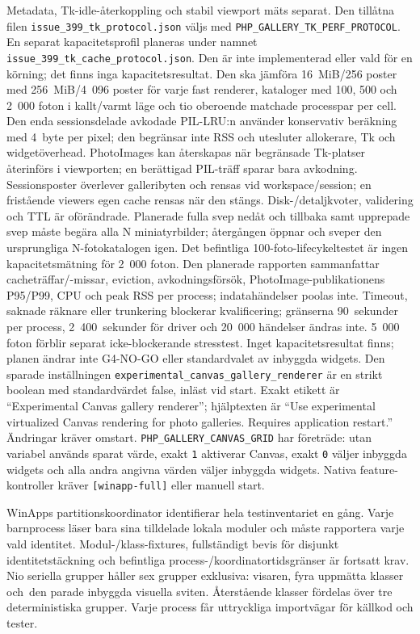 \documentclass[11pt,a4paper]{article}
\newcommand{\codeword}[1]{\nolinkurl{#1}}
\begin{document}
Metadata, Tk-idle-återkoppling och stabil
viewport mäts separat. Den tillåtna filen
\codeword{issue_399_tk_protocol.json} väljs med
\codeword{PHP_GALLERY_TK_PERF_PROTOCOL}. En separat kapacitetsprofil planeras under namnet
\codeword{issue_399_tk_cache_protocol.json}. Den är inte implementerad eller
vald för en körning; det finns inga kapacitetsresultat. Den ska jämföra
16~MiB/256 poster med 256~MiB/4~096 poster för varje fast renderer, kataloger
med 100, 500 och 2~000 foton i kallt/varmt läge och tio oberoende matchade
processpar per cell. Den enda sessionsdelade avkodade PIL-LRU:n använder
konservativ beräkning med 4~byte per pixel; den begränsar inte RSS och utesluter
allokerare, Tk och widgetöverhead. PhotoImages kan återskapas när begränsade
Tk-platser återinförs i viewporten; en berättigad PIL-träff sparar bara
avkodning. Sessionsposter överlever galleribyten och rensas vid workspace/session;
en fristående viewers egen cache rensas när den stängs. Disk-/detaljkvoter,
validering och TTL är oförändrade. Planerade fulla svep nedåt och tillbaka samt
upprepade svep måste begära alla N miniatyrbilder; återgången öppnar och sveper
den ursprungliga N-fotokatalogen igen. Det befintliga 100-foto-lifecykeltestet
är ingen kapacitetsmätning för 2~000 foton. Den planerade rapporten sammanfattar
cacheträffar/-missar, eviction, avkodningsförsök, PhotoImage-publikationens
P95/P99, CPU och peak RSS per process; indatahändelser poolas inte. Timeout,
saknade räknare eller trunkering blockerar kvalificering; gränserna 90~sekunder
per process, 2~400~sekunder för driver och 20~000 händelser ändras inte.
5~000 foton förblir separat icke-blockerande stresstest. Inget kapacitetsresultat
finns; planen ändrar inte G4-NO-GO eller standardvalet av inbyggda widgets.
Den sparade inställningen
\codeword{experimental_canvas_gallery_renderer} är en strikt boolean med standardvärdet false, inläst vid start. Exakt etikett är
“Experimental Canvas gallery renderer”; hjälptexten är “Use experimental
virtualized Canvas rendering for photo galleries. Requires application
restart.” Ändringar kräver omstart. \codeword{PHP_GALLERY_CANVAS_GRID} har
företräde: utan variabel används sparat värde, exakt \codeword{1} aktiverar
Canvas, exakt \codeword{0} väljer inbyggda widgets och alla andra angivna värden
väljer inbyggda widgets. Nativa feature-kontroller kräver
\codeword{[winapp-full]} eller manuell start.

WinApps partitionskoordinator identifierar hela testinventariet en gång.
Varje barnprocess läser bara sina tilldelade lokala moduler och måste rapportera
varje vald identitet. Modul-/klass-fixtures, fullständigt bevis för disjunkt
identitetstäckning och befintliga process-/koordinatortidsgränser är fortsatt krav.
Nio seriella grupper håller sex grupper exklusiva: visaren, fyra uppmätta
klasser och~den parade inbyggda visuella sviten. Återstående klasser fördelas
över tre deterministiska grupper. Varje process får uttryckliga importvägar för
källkod och tester.
\end{document}
